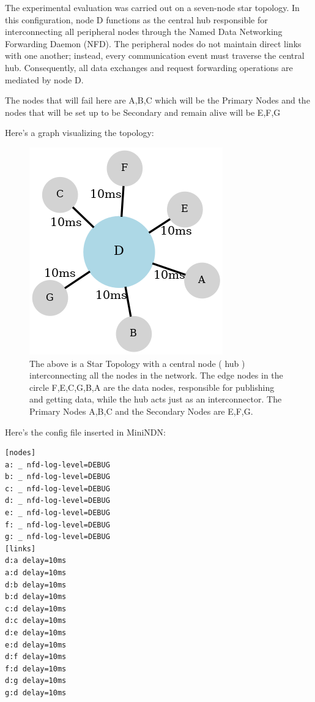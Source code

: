 \documentclass{article}
\begin{document}
The experimental evaluation was carried out on a seven-node star topology. In this configuration, node D functions as the central hub responsible for interconnecting all peripheral nodes through the Named Data Networking Forwarding Daemon (NFD). The peripheral nodes do not maintain direct links with one another; instead, every communication event must traverse the central hub. Consequently, all data exchanges and request forwarding operations are mediated by node D.

The nodes that will fail here are A,B,C which will be the Primary Nodes and the nodes that will be set up to be Secondary and remain alive will be E,F,G

\pagebreak

Here's a graph visualizing the topology:

\begin{figure}[H]
    \centering
    \includegraphics[width=0.5\linewidth]{images/star_topology.png}
    \caption{The above is a Star Topology with a central node ( hub ) interconnecting all the nodes in the network. The edge nodes in the circle F,E,C,G,B,A are the data nodes, responsible for publishing and getting data, while the hub acts just as an interconnector. The Primary Nodes A,B,C and the Secondary Nodes are E,F,G.}
    \label{fig:star-topology}
\end{figure}

Here's the config file inserted in MiniNDN:

\begin{lstlisting}[language=minindnconf, caption={The MiniNDN config for creating a star topology},label={lst:minindnconf-star-topology}]
[nodes]
a: _ nfd-log-level=DEBUG
b: _ nfd-log-level=DEBUG
c: _ nfd-log-level=DEBUG
d: _ nfd-log-level=DEBUG
e: _ nfd-log-level=DEBUG
f: _ nfd-log-level=DEBUG
g: _ nfd-log-level=DEBUG
[links]
d:a delay=10ms
a:d delay=10ms
d:b delay=10ms
b:d delay=10ms
c:d delay=10ms
d:c delay=10ms
d:e delay=10ms
e:d delay=10ms
d:f delay=10ms
f:d delay=10ms
d:g delay=10ms
g:d delay=10ms 
\end{lstlisting}
\end{document}
